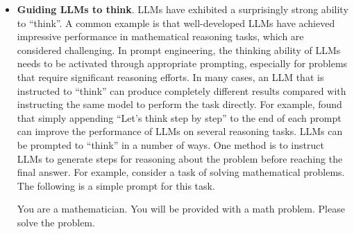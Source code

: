 \begin{itemize}
    \vspace{0.5em}
    \begin{tcolorbox}

    \begingroup
    \setlength{\leftskip}{2em}
    \setlength{\rightskip}{2em}

    Explain the causes and effects of climate change to a 10-year-old child. Talk about how it affects the weather, sea levels, and temperatures. Also, mention some things people are doing to help. Try to explain in simple terms and do not exceed 500 words.

    \underline{\hspace{2em}}

    \endgroup

    \end{tcolorbox}
    \vspace{0.5em}

\item \vspace{0.3em} \textbf{Guiding LLMs to think}. LLMs have exhibited a surprisingly strong ability to ``think''. A common example is that well-developed LLMs have achieved impressive performance in mathematical reasoning tasks, which are considered challenging. In prompt engineering, the thinking  ability of LLMs needs to be activated through appropriate prompting, especially for problems that require significant reasoning efforts. In many cases, an LLM that is instructed to ``think'' can produce completely different results compared with instructing the same model to perform the task directly. For example, \citet{kojima-etal:2022large} found that simply appending ``Let's think step by step'' to the end of each prompt can improve the performance of LLMs on several reasoning tasks. LLMs can be prompted to ``think'' in a number of ways. One method is to instruct LLMs to generate steps for reasoning about the problem before reaching the final answer. For example, consider a task of solving mathematical problems. The following is a simple prompt for this task.

    \vspace{0.5em}
    \begin{tcolorbox}

    \begingroup
    \setlength{\leftskip}{2em}
    \setlength{\rightskip}{2em}

    You are a mathematician. You will be provided with a math problem. Please solve the problem.

    \underline{\hspace{2em}}


\end{tcolorbox}
\end{itemize}
